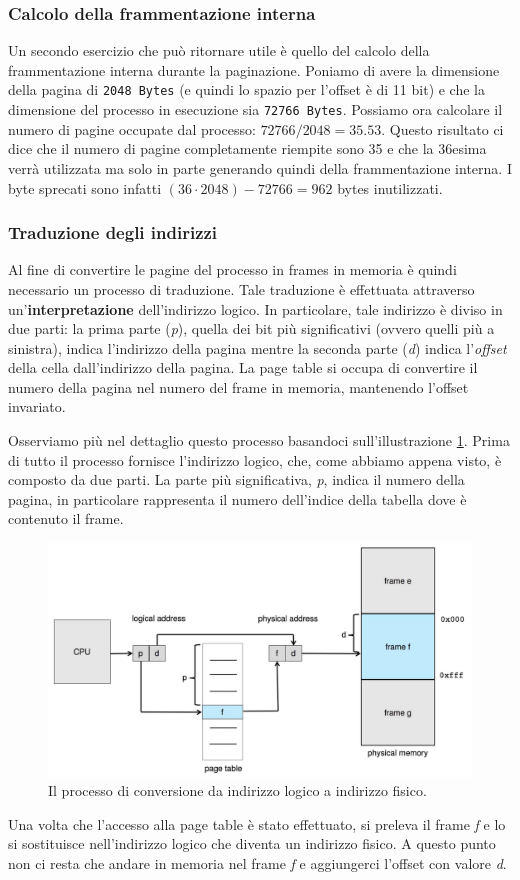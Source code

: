 % 
\subsubsection*{Calcolo della frammentazione interna}
Un secondo esercizio che può ritornare utile è quello del calcolo della frammentazione interna durante la paginazione. Poniamo di avere la dimensione della pagina di \texttt{2048 Bytes} (e quindi lo spazio per l'offset è di 11 bit) e che la dimensione del processo in esecuzione sia \texttt{72766 Bytes}. Possiamo ora calcolare il numero di pagine occupate dal processo: $72766 / 2048 = 35.53$. Questo risultato ci dice che il numero di pagine completamente riempite sono 35 e che la 36esima verrà utilizzata ma solo in parte generando quindi della frammentazione interna. I byte sprecati sono infatti $(36 \cdot 2048) - 72766 = 962$ bytes inutilizzati. 

% 
\subsubsection{Traduzione degli indirizzi}
Al fine di convertire le pagine del processo in frames in memoria è quindi necessario un processo di traduzione. Tale traduzione è effettuata attraverso un'\textbf{interpretazione} dell'indirizzo logico. In particolare, tale indirizzo è diviso in due parti: la prima parte (\textit{p}), quella dei bit più significativi (ovvero quelli più a sinistra), indica l'indirizzo della pagina mentre la seconda parte (\textit{d}) indica l'\textit{offset} della cella dall'indirizzo della pagina. La page table si occupa di convertire il numero della pagina nel numero del frame in memoria, mantenendo l'offset invariato.

Osserviamo più nel dettaglio questo processo basandoci sull'illustrazione \ref{fig:paging_hardware}. Prima di tutto il processo fornisce l'indirizzo logico, che, come abbiamo appena visto, è composto da due parti. La parte più significativa, \textit{p}, indica il numero della pagina, in particolare rappresenta il numero dell'indice della tabella dove è contenuto il frame.
\begin{figure}[h]
    \centering
    \includegraphics[width = .8\textwidth]{../res/imgs/main memory/paging_hardware.png}
    \caption{Il processo di conversione da indirizzo logico a indirizzo fisico.}
    \label{fig:paging_hardware}
\end{figure}
 Una volta che l'accesso alla page table è stato effettuato, si preleva il frame \textit{f} e lo si sostituisce nell'indirizzo logico che diventa un indirizzo fisico. A questo punto non ci resta che andare in memoria nel frame \textit{f} e aggiungerci l'offset con valore \textit{d}.

